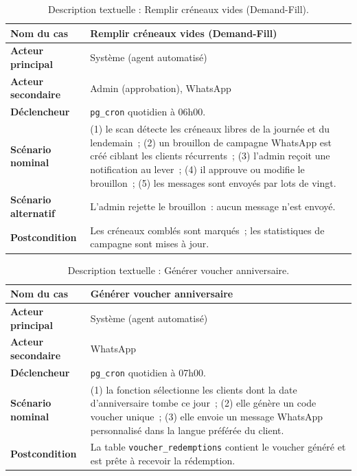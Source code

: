 \begin{table}[H]
  \centering\small
  \caption{Description textuelle : Remplir créneaux vides (Demand-Fill).}
  \label{tab:uc-s3-fill}
  \renewcommand{\arraystretch}{1.45}
  \begin{tabular}{|p{3.0cm}|>{\raggedright\arraybackslash}p{10.8cm}|}
    \hline\hline
    \textbf{Nom du cas} & Remplir créneaux vides (Demand-Fill) \\
    \hline
    \textbf{Acteur principal} & Système (agent automatisé) \\
    \hline
    \textbf{Acteur secondaire} & Admin (approbation), WhatsApp \\
    \hline
    \textbf{Déclencheur} & \texttt{pg\_cron} quotidien à 06h00. \\
    \hline
    \textbf{Scénario nominal} &
      (1) le scan détecte les créneaux libres de la journée et du
          lendemain~;
      (2) un brouillon de campagne WhatsApp est créé ciblant les
          clients récurrents~;
      (3) l'admin reçoit une notification au lever~;
      (4) il approuve ou modifie le brouillon~;
      (5) les messages sont envoyés par lots de vingt. \\
      \hline
    \textbf{Scénario alternatif} & L'admin rejette le brouillon~:
      aucun message n'est envoyé. \\
      \hline
    \textbf{Postcondition} & Les créneaux comblés sont marqués~;
      les statistiques de campagne sont mises à jour. \\
    \hline\hline
  \end{tabular}
\end{table}

\begin{table}[H]
  \centering\small
  \caption{Description textuelle : Générer voucher anniversaire.}
  \label{tab:uc-s3-voucher}
  \renewcommand{\arraystretch}{1.45}
  \begin{tabular}{|p{3.0cm}|>{\raggedright\arraybackslash}p{10.8cm}|}
    \hline\hline
    \textbf{Nom du cas} & Générer voucher anniversaire \\
    \hline
    \textbf{Acteur principal} & Système (agent automatisé) \\
    \hline
    \textbf{Acteur secondaire} & WhatsApp \\
    \hline
    \textbf{Déclencheur} & \texttt{pg\_cron} quotidien à 07h00. \\
    \hline
    \textbf{Scénario nominal} &
      (1) la fonction sélectionne les clients dont la date
          d'anniversaire tombe ce jour~;
      (2) elle génère un code voucher unique~;
      (3) elle envoie un message WhatsApp personnalisé dans la
          langue préférée du client. \\
          \hline
    \textbf{Postcondition} & La table \texttt{voucher\_redemptions}
      contient le voucher généré et est prête à recevoir la
      rédemption. \\
    \hline\hline
  \end{tabular}
\end{table}


